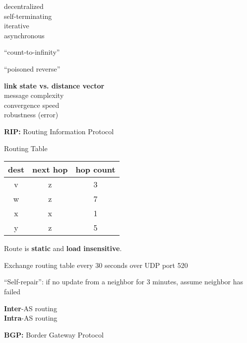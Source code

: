 \begin{cf}{
	decentralized\\
	self-terminating\\
	iterative\\
	asynchronous\\
}
\end{cf}
\begin{cf}{
	``count-to-infinity''
}
\end{cf}
\begin{cf}{
	``poisoned reverse''
}
\end{cf}
\begin{cf}{
	\textbf{link state vs. distance vector}\\
	message complexity\\
	convergence speed\\
	robustness (error)\\
}
\end{cf}
\begin{cf}{
	\textbf{RIP:} Routing Information Protocol
}
\end{cf}
\begin{cf}{
	Routing Table
	\begin{tabular}{c|c|c}
	dest & next hop & hop count \\
	\hline
	v & z & 3\\
	w & z & 7\\
	x & x & 1\\
	y & z & 5\\
	\end{tabular}
}
\end{cf}
\begin{cf}{
	Route is \textbf{static} and \textbf{load insensitive}.
}
\end{cf}
\begin{cf}{
	Exchange routing table every 30 seconds over UDP port 520
}
\end{cf}
\begin{cf}{
	``Self-repair'': if no update from a neighbor for 3 minutes, assume neighbor has failed
}
\end{cf}

\begin{cf}{
\textbf{Inter}-AS routing\\
\textbf{Intra}-AS routing
}
\end{cf}

\begin{cf}{
	\textbf{BGP:} Border Gateway Protocol
}
\end{cf}

